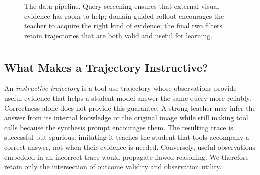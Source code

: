 \begin{figure}[t]
    \centering
    \caption{The \method data pipeline. Query screening ensures that external visual evidence has room to help; domain-guided rollout encourages the teacher to acquire the right kind of evidence; the final two filters retain trajectories that are both valid and useful for learning.}
    \label{fig:pipeline}
\end{figure}

\section{\method}
\label{sec:method}

\subsection{What Makes a Trajectory Instructive?}

An \emph{instructive trajectory} is a tool-use trajectory whose observations provide useful evidence that helps a student model answer the same query more reliably. Correctness alone does not provide this guarantee. A strong teacher may infer the answer from its internal knowledge or the original image while still making tool calls because the synthesis prompt encourages them. The resulting trace is successful but spurious: imitating it teaches the student that tools accompany a correct answer, not when their evidence is needed. Conversely, useful observations embedded in an incorrect trace would propagate flawed reasoning. We therefore retain only the intersection of outcome validity and observation utility.

